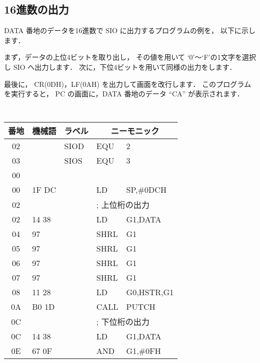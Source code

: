 \subsection{16進数の出力}

DATA 番地のデータを16進数で SIO に出力するプログラムの例を，
以下に示します．

まず，データの上位4ビットを取り出し，
その値を用いて `0'〜`F'の1文字を選択し SIO へ出力します．
次に，下位4ビットを用いて同様の出力をします．

最後に，
CR(0DH)，LF(0AH) を出力して画面を改行します．
このプログラムを実行すると，
PC の画面に，DATA 番地のデータ ``CA'' が表示されます．

\begin{center}
{\small\tt
\begin{tabular}{|c|l|l|l l |} \hline
番地 & 機械語 & ラベル & \multicolumn{2}{|c|}{ニーモニック} \\
\hline
02 &               & SIOD   & EQU    & 2                   \\
03 &               & SIOS   & EQU    & 3                   \\
00 &               &        &        &                     \\                
00 & 1F DC         &        & LD     & SP,\#0DCH           \\
02 &               &        & \multicolumn{2}{l|}{; 上位桁の出力} \\
02 & 14 38         &        & LD     & G1,DATA             \\
04 & 97            &        & SHRL   & G1                  \\
05 & 97            &        & SHRL   & G1                  \\
06 & 97            &        & SHRL   & G1                  \\
07 & 97            &        & SHRL   & G1                  \\
08 & 11 28         &        & LD     & G0,HSTR,G1          \\
0A & B0 1D         &        & CALL   & PUTCH               \\
0C &               &        & \multicolumn{2}{l|}{; 下位桁の出力} \\
0C & 14 38         &        & LD     & G1,DATA             \\
0E & 67 0F         &        & AND    & G1,\#0FH            \\

\end{tabular}}
\end{center}
